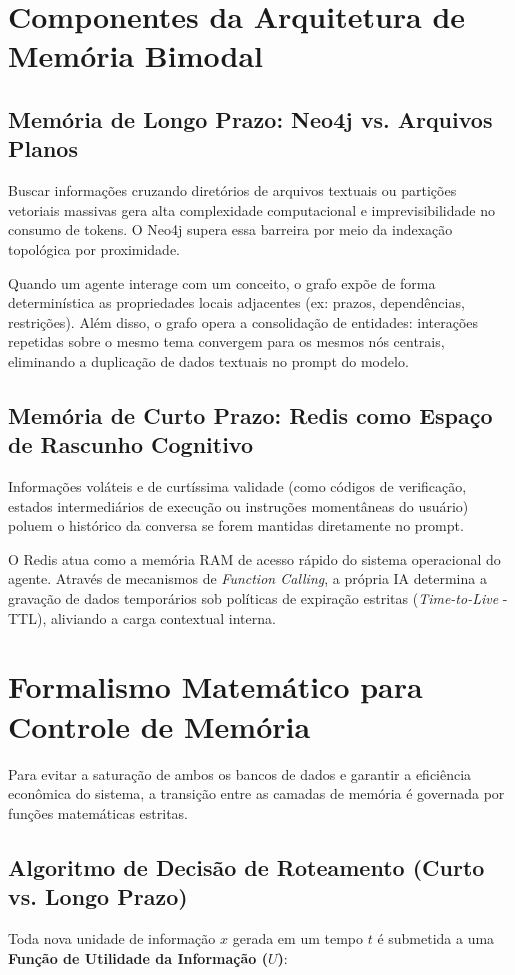 \documentclass[11pt,a4paper]{article}
\begin{document}
\section{Componentes da Arquitetura de Memória Bimodal}

\subsection{Memória de Longo Prazo: Neo4j vs. Arquivos Planos}
Buscar informações cruzando diretórios de arquivos textuais ou partições vetoriais massivas gera alta complexidade computacional e imprevisibilidade no consumo de tokens. O Neo4j supera essa barreira por meio da indexação topológica por proximidade. 

Quando um agente interage com um conceito, o grafo expõe de forma determinística as propriedades locais adjacentes (ex: prazos, dependências, restrições). Além disso, o grafo opera a consolidação de entidades: interações repetidas sobre o mesmo tema convergem para os mesmos nós centrais, eliminando a duplicação de dados textuais no prompt do modelo.

\subsection{Memória de Curto Prazo: Redis como Espaço de Rascunho Cognitivo}
Informações voláteis e de curtíssima validade (como códigos de verificação, estados intermediários de execução ou instruções momentâneas do usuário) poluem o histórico da conversa se forem mantidas diretamente no prompt.

O Redis atua como a memória RAM de acesso rápido do sistema operacional do agente. Através de mecanismos de \textit{Function Calling}, a própria IA determina a gravação de dados temporários sob políticas de expiração estritas (\textit{Time-to-Live} - TTL), aliviando a carga contextual interna.

\section{Formalismo Matemático para Controle de Memória}

Para evitar a saturação de ambos os bancos de dados e garantir a eficiência econômica do sistema, a transição entre as camadas de memória é governada por funções matemáticas estritas.

\subsection{Algoritmo de Decisão de Roteamento (Curto vs. Longo Prazo)}
Toda nova unidade de informação $x$ gerada em um tempo $t$ é submetida a uma \textbf{Função de Utilidade da Informação ($U$)}:
\end{document}
